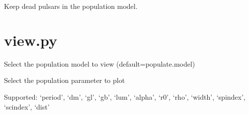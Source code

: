 \documentclass[letterpaper,10pt,english]{sphinxmanual}
\begin{document}
\begin{fulllineitems}
\label{\detokenize{cmd-line-docs:cmdoption-evolve.py-keepdead}}
\pysigstartsignatures
\pysigline
{\sphinxcode{\sphinxupquote{}}}
\pysigstopsignatures
\sphinxAtStartPar
Keep dead pulsars in the population model.

\end{fulllineitems}



\section{view.py}
\label{\detokenize{cmd-line-docs:view-py}}\label{\detokenize{cmd-line-docs:view-doc}}\label{\detokenize{cmd-line-docs:view-docs}}

\begin{fulllineitems}
\label{\detokenize{cmd-line-docs:cmdoption-view.py-f}}
\pysigstartsignatures
\pysigline
{}
\pysigstopsignatures
\sphinxAtStartPar
Select the population model to view (default=populate.model)

\end{fulllineitems}


\begin{fulllineitems}
\label{\detokenize{cmd-line-docs:cmdoption-view.py-p}}
\pysigstartsignatures
\pysigline
{}
\pysigstopsignatures
\sphinxAtStartPar
Select the population parameter to plot

\sphinxAtStartPar
Supported: ‘period’, ‘dm’, ‘gl’, ‘gb’, ‘lum’, ‘alpha’, ‘r0’, ‘rho’, ‘width’, ‘spindex’, ‘scindex’, ‘dist’

\end{fulllineitems}

\end{document}
